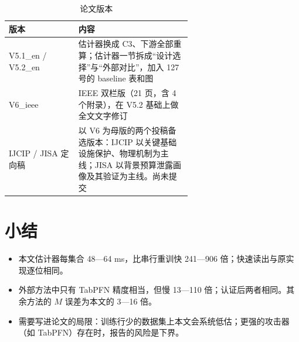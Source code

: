\documentclass[zihao=-4,a4paper]{ctexart}
\begin{document}
\begin{table}[H]\centering
\caption{论文版本}
\small
\begin{tabular}{lp{0.62\linewidth}}
\toprule
版本 & 内容 \\
\midrule
V5.1\_en / V5.2\_en & 估计器换成 C3、下游全部重算；估计器一节拆成“设计选择”与“外部对比”，加入 127 号的 baseline 表和图 \\
V6\_ieee & IEEE 双栏版（21 页，含 4 个附录），在 V5.2 基础上做全文文字修订 \\
IJCIP / JISA 定向稿 & 以 V6 为母版的两个投稿备选版本：IJCIP 以关键基础设施保护、物理机制为主线；JISA 以背景预算泄露画像及其验证为主线。尚未提交 \\
\bottomrule
\end{tabular}
\end{table}

\section{小结}

\begin{keybox}[小结]
\begin{itemize}[leftmargin=*]
  \item 本文估计器每集合 48—64 ms，比串行重训快 241—906 倍；快速读出与原实现逐位相同。
  \item 外部方法中只有 TabPFN 精度相当，但慢 13—110 倍；认证后两者相同。其余方法的 $M$ 误差为本文的 3—16 倍。
  \item 需要写进论文的局限：训练行少的数据集上本文会系统低估；更强的攻击器（如 TabPFN）存在时，报告的风险是下界。
\end{itemize}
\end{keybox}
\end{document}
